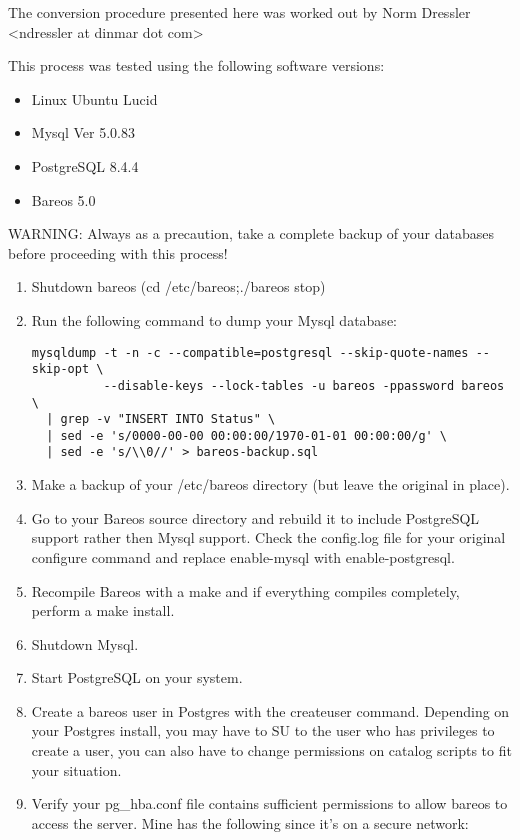 The conversion procedure presented here was worked out by Norm Dressler
{\textless}ndressler at dinmar dot com{\textgreater}

This process was tested using the following software versions:

\begin{itemize}
\item Linux Ubuntu Lucid
\item Mysql Ver 5.0.83
\item PostgreSQL 8.4.4
\item Bareos 5.0
   \end{itemize}

WARNING: Always as a precaution, take a complete backup of your databases
before proceeding with this process!

\begin{enumerate}
\item Shutdown bareos (cd /etc/bareos;./bareos stop)
\item Run the following command to dump your Mysql database:

   \footnotesize
\begin{verbatim}
mysqldump -t -n -c --compatible=postgresql --skip-quote-names --skip-opt \
          --disable-keys --lock-tables -u bareos -ppassword bareos \
  | grep -v "INSERT INTO Status" \
  | sed -e 's/0000-00-00 00:00:00/1970-01-01 00:00:00/g' \
  | sed -e 's/\\0//' > bareos-backup.sql
\end{verbatim}
\normalsize

\item Make a backup of your /etc/bareos directory (but leave the  original in
   place).
\item Go to your Bareos source directory and rebuild it to include  PostgreSQL
   support rather then Mysql support. Check the  config.log file for your
   original configure command and replace  enable-mysql with enable-postgresql.
\item Recompile Bareos with a make and if everything compiles  completely,
   perform a make install.
\item Shutdown Mysql.
\item Start PostgreSQL on your system.
\item Create a bareos user in Postgres with the createuser command.  Depending on
   your Postgres install, you may have to SU to the  user who has privileges to
   create a user, you can also have to change permissions on catalog scripts
   to fit your situation.
\item Verify your pg\_hba.conf file contains sufficient permissions to  allow
   bareos to access the server. Mine has the following since  it's on a secure
   network:


\end{enumerate}
